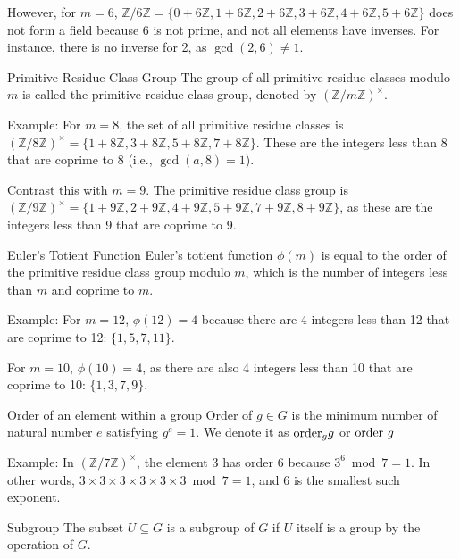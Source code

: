 \documentclass{article}
\begin{document}
However, for $m = 6$, $\mathbb{Z}/6\mathbb{Z} = \{0 + 6\mathbb{Z}, 1+ 6\mathbb{Z}, 2+ 6\mathbb{Z}, 3+ 6\mathbb{Z}, 4+ 6\mathbb{Z}, 5+ 6\mathbb{Z}\}$ does not form a field because 6 is not prime, and not all elements have inverses. For instance, there is no inverse for 2, as $\gcd(2, 6) \neq 1$.

\begin{definition}{Primitive Residue Class Group}{}
The group of all primitive residue classes modulo $m$ is called the primitive residue class group, denoted by $(\mathbb{Z}/m\mathbb{Z})^{\times}$.
\end{definition}

Example: For $m = 8$, the set of all primitive residue classes is $(\mathbb{Z}/8\mathbb{Z})^{\times} = \{1 + 8\mathbb{Z}, 3 + 8\mathbb{Z}, 5 + 8\mathbb{Z}, 7 + 8\mathbb{Z}\}$. These are the integers less than 8 that are coprime to 8 (i.e., $\gcd(a, 8) = 1$).

Contrast this with $m = 9$. The primitive residue class group is $(\mathbb{Z}/9\mathbb{Z})^{\times} = \{1 + 9\mathbb{Z}, 2 + 9\mathbb{Z}, 4 + 9\mathbb{Z}, 5 + 9\mathbb{Z}, 7 + 9\mathbb{Z}, 8 + 9\mathbb{Z}\}$, as these are the integers less than 9 that are coprime to 9.


\begin{definition}{Euler's Totient Function}{}
Euler's totient function $\phi(m)$ is equal to the order of the primitive residue class group modulo $m$, which is the number of integers less than $m$ and coprime to $m$.
\end{definition}

Example: For $m = 12$, $\phi(12) = 4$ because there are 4 integers less than 12 that are coprime to 12: $\{1, 5, 7, 11\}$.

For $m = 10$, $\phi(10) = 4$, as there are also 4 integers less than 10 that are coprime to 10: $\{1, 3, 7, 9\}$.

\begin{definition}{Order of an element within a group}{}
    Order of $g \in G$ is the minimum number of natural number $e$ satisfying $g^{e} = 1$. We denote it as $\hbox{order}_g g$ or $\hbox{order } g$
\end{definition}

Example: In $(\mathbb{Z}/7\mathbb{Z})^{\times}$, the element 3 has order 6 because $3^6 \bmod 7 = 1$. In other words, $3 \times 3 \times 3 \times 3 \times 3 \times 3 \bmod 7 = 1$, and 6 is the smallest such exponent.

\begin{definition}{Subgroup}{}
    The subset $U \subseteq G$ is a subgroup of $G$ if $U$ itself is a group by the operation of $G$.
\end{definition}
\end{document}
